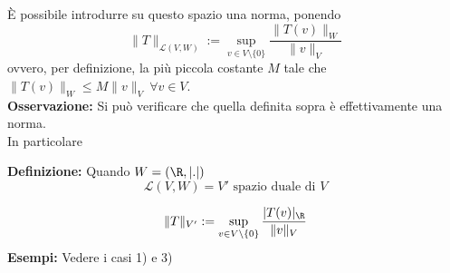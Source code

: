 È possibile introdurre su questo spazio una norma, ponendo 
\[\|T\|_{\mathcal L(V,W)}:=\sup_{v\in V\setminus \{0\} }\frac{\|T(v)\|_W}{\|v\|_V}\]
ovvero, per definizione, la più piccola costante $M$ tale che $\|T(v)\|_W\le M \|v\|_V\ \forall v\in V$.
\\\textbf{Osservazione:} Si può verificare che quella definita sopra è effettivamente una norma.\\
In particolare
\begin{tcolorbox}
	\textbf{Definizione: }Quando $W=(\R,|.|)$ 
	\[\mathcal L (V,W)=V'\text{ spazio duale di }V\]
\end{tcolorbox}
\[\|T\|_{V'}:=\sup_{v\in V\setminus \{0\} } \frac{|T(v)|_{\R}}{\|v\|_V}\]
\textbf{Esempi: }Vedere i casi 1) e 3)

